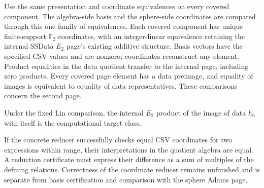 \begin{definition}
  \label{def:lin-e2-coordinates}
  \notready
  Use the same presentation and coordinate equivalences on every covered
  component. The algebra-side basis and the sphere-side coordinates are
  compared through this one family of equivalences.
  Each covered component has unique finite-support $\mathbb F_2$
  coordinates, with an integer-linear equivalence retaining the internal
  SSData $E_2$ page's existing additive structure.
  Basis vectors have the specified CSV values and are nonzero; coordinates
  reconstruct any element. Product equalities in the data quotient transfer
  to the internal page, including zero products. Every covered page element
  has a data preimage, and equality of images is equivalent to equality of
  data representatives. These comparisons concern the second page.
\end{definition}

\begin{lemma}
  \label{lem:lin-h6-square-product}
  \notready
  Under the fixed Lin comparison, the internal $E_2$ product of the image of
  data $h_6$ with itself is the computational target class.
\end{lemma}

\begin{theorem}
  \label{thm:lin-e2-coordinate-check}
  \notready
  If the concrete reducer successfully checks equal CSV coordinates for two
  expressions within range, their interpretations in the quotient algebra
  are equal. A reduction certificate must express their difference as a
  sum of multiples of the defining relations. Correctness of the coordinate
  reducer remains unfinished and is separate from basis certification and
  comparison with the sphere Adams page.
\end{theorem}
